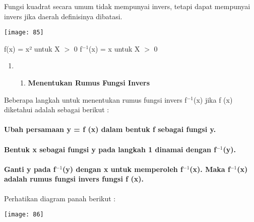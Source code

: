 \documentclass[11pt,fleqn]{book} %
\begin{document}
\begin{myEnumerate}
\begin{itemize}
\noindent 

\noindent Fungsi kuadrat secara umum tidak mempunyai invers, tetapi dapat mempunyai invers jika daerah definisinya dibatasi.

\noindent 

\begin{center}
\noindent \texttt{[image: 85]}
\end{center}

\noindent 

\noindent 

\noindent f(x) = x² untuk X $>$ 0 f${}^{-1}$(x) = x untuk X $>$ 0

\noindent 

\begin{enumerate}
\item \begin{enumerate}
\item  \textbf{Menentukan Rumus Fungsi Invers}
\end{enumerate}
\end{enumerate}

Beberapa langkah untuk menentukan rumus fungsi invers f${}^{-1}$(x) jika f (x) diketahui adalah sebagai berikut :\textbf{}


\paragraph{ Ubah persamaan y = f (x) dalam bentuk f sebagai fungsi y.}


\paragraph{ Bentuk x sebagai fungsi y pada langkah 1 dinamai dengan f${}^{-1}$(y).}


\paragraph{ Ganti y pada f${}^{-1}$(y) dengan x untuk memperoleh f${}^{-1}$(x). Maka f${}^{-1}$(x) adalah rumus fungsi invers fungsi f (x).}

\noindent \textbf{}

\noindent        Perhatikan diagram panah berikut :

\begin{center}
\noindent \texttt{[image: 86]}
\end{center}


\end{itemize}
\end{myEnumerate}
\end{document}
